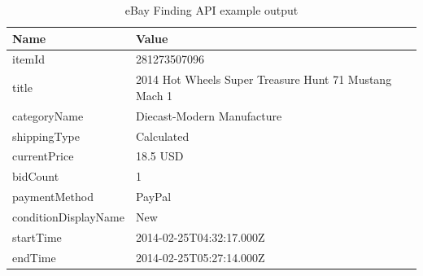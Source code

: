\begin{table}[h!]
	\begin{center}
	\begin{tabular}{| l | l |}
		\hline
		\textbf{Name} & \textbf{Value} \\
		\hline
		itemId & 281273507096 \\
		\hline
		title & 2014 Hot Wheels Super Treasure Hunt 71 Mustang Mach 1 \\
		\hline
		categoryName & Diecast-Modern Manufacture \\
		\hline
		shippingType & Calculated \\
		\hline
		currentPrice & 18.5 USD \\
		\hline
		bidCount & 1 \\
		\hline
		paymentMethod & PayPal \\
		\hline
		conditionDisplayName & New \\
		\hline
		startTime & 2014-02-25T04:32:17.000Z \\
		\hline
		endTime & 2014-02-25T05:27:14.000Z \\
		\hline
	\end{tabular}
	\end{center}
	\caption{eBay Finding API example output}
\end{table}
